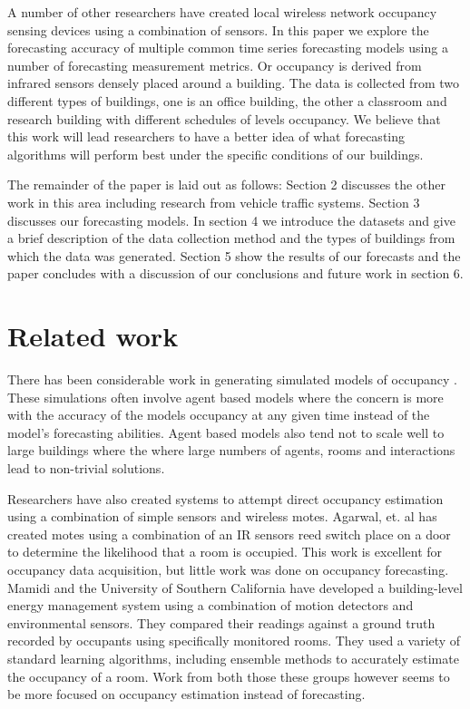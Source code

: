\documentclass{acm_proc_article-sp}
\begin{document}
A number of other researchers have created local wireless network occupancy sensing devices using a combination of sensors.  In this paper we explore the forecasting accuracy of multiple common time series forecasting models using a number of forecasting measurement metrics.  Or occupancy is derived from infrared sensors densely placed around a building.  The data is collected from two different types of buildings, one is an office building, the other a classroom and research building with different schedules of levels occupancy.  We believe that this work will lead researchers to have a better idea of what forecasting algorithms will perform best under the specific conditions of our buildings.  

The remainder of the paper is laid out as follows: Section 2 discusses the other work in this area including research from vehicle traffic systems.  Section 3 discusses our forecasting models.  In section 4 we introduce the datasets and give a brief description of the data collection method and the types of buildings from which the data was generated.  Section 5 show the results of our forecasts and the paper concludes with a discussion of our conclusions and future work in section 6.

\section{Related work}
There has been considerable work in generating simulated models of occupancy \cite{PAGE2008, GOLDSTEIN2010}.  These simulations often involve agent based models where the concern is more with the accuracy of the models occupancy at any given time instead of the model's forecasting abilities.   Agent based models also tend not to scale well to large buildings where the where large numbers of agents, rooms and interactions lead to non-trivial solutions.

Researchers have also created systems to attempt direct occupancy estimation using a combination of simple sensors and wireless motes.  Agarwal, et. al \cite{Agarwal2010} has created motes using a combination of an IR sensors reed switch place on a door to determine the likelihood that a room is occupied.  This work is excellent for occupancy data acquisition, but little work was done on occupancy forecasting.  Mamidi \cite{Mamidi2012} and the University of Southern California have developed a building-level energy management system using a combination of motion detectors and environmental sensors.  They compared their readings against a ground truth recorded by occupants using specifically monitored rooms.  They used a variety of standard learning algorithms, including ensemble methods to accurately estimate the occupancy of a room.  Work from both those these groups however seems to be more focused on occupancy estimation instead of forecasting.
\end{document}
